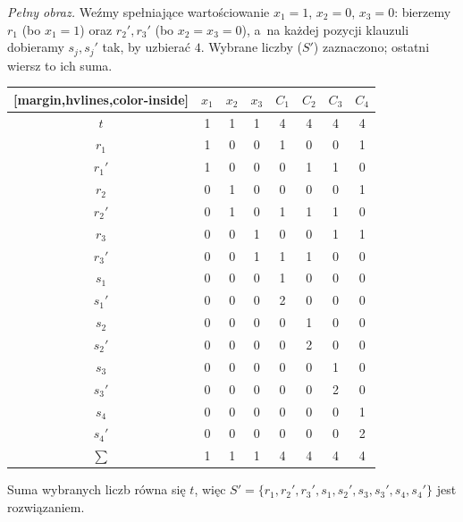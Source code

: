 \begin{example}
	\emph{Pełny obraz.} Weźmy spełniające wartościowanie $x_1 = 1$, $x_2 = 0$, $x_3 = 0$: bierzemy $r_1$ (bo $x_1 = 1$) oraz $r_2', r_3'$ (bo $x_2 = x_3 = 0$), a~na każdej pozycji klauzuli dobieramy $s_j, s_j'$ tak, by uzbierać $4$. Wybrane liczby ($S'$) zaznaczono; ostatni wiersz to ich suma.
	\begin{table}[H]
		\centering
		\renewcommand{\arraystretch}{1.2}
		\begin{NiceTabular}{c|ccc|cccc}[margin,hvlines,color-inside]
			           & $x_1$ & $x_2$ & $x_3$ & $C_1$ & $C_2$ & $C_3$ & $C_4$ \\
			\hline
			$t$        & 1     & 1     & 1     & 4     & 4     & 4     & 4     \\
			\hline
			 $r_1$  & 1 & 0 & 0 & 1 & 0 & 0 & 1 \\
			$r_1'$     & 1     & 0     & 0     & 0     & 1     & 1     & 0     \\
			$r_2$      & 0     & 1     & 0     & 0     & 0     & 0     & 1     \\
			 $r_2'$ & 0 & 1 & 0 & 1 & 1 & 1 & 0 \\
			$r_3$      & 0     & 0     & 1     & 0     & 0     & 1     & 1     \\
			 $r_3'$ & 0 & 0 & 1 & 1 & 1 & 0 & 0 \\
			 $s_1$  & 0 & 0 & 0 & 1 & 0 & 0 & 0 \\
			$s_1'$     & 0     & 0     & 0     & 2     & 0     & 0     & 0     \\
			$s_2$      & 0     & 0     & 0     & 0     & 1     & 0     & 0     \\
			 $s_2'$ & 0 & 0 & 0 & 0 & 2 & 0 & 0 \\
			 $s_3$  & 0 & 0 & 0 & 0 & 0 & 1 & 0 \\
			 $s_3'$ & 0 & 0 & 0 & 0 & 0 & 2 & 0 \\
			 $s_4$  & 0 & 0 & 0 & 0 & 0 & 0 & 1 \\
			 $s_4'$ & 0 & 0 & 0 & 0 & 0 & 0 & 2 \\
			\hline
			$\sum$     & 1     & 1     & 1     & 4     & 4     & 4     & 4     \\
		\end{NiceTabular}
	\end{table}
	Suma wybranych liczb równa się $t$, więc $S' = \{r_1, r_2', r_3', s_1, s_2', s_3, s_3', s_4, s_4'\}$ jest rozwiązaniem.
\end{example}
